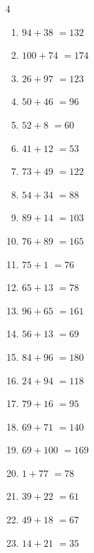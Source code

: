\begin{multicols}{4}
\begin{enumerate}
  \item $94+38$
        $=132$

  \item $100+74$
        $=174$

  \item $26+97$
        $=123$

  \item $50+46$
        $=96$

  \item $52+8$
        $=60$

  \item $41+12$
        $=53$

  \item $73+49$
        $=122$

  \item $54+34$
        $=88$

  \item $89+14$
        $=103$

  \item $76+89$
        $=165$

  \item $75+1$
        $=76$

  \item $65+13$
        $=78$

  \item $96+65$
        $=161$

  \item $56+13$
        $=69$

  \item $84+96$
        $=180$

  \item $24+94$
        $=118$

\columnbreak %

\resetques

  \item $79+16$
        $=95$

  \item $69+71$
        $=140$

  \item $69+100$
        $=169$

  \item $1+77$
        $=78$

  \item $39+22$
        $=61$

  \item $49+18$
        $=67$

  \item $14+21$
        $=35$


\end{enumerate}
\end{multicols}
